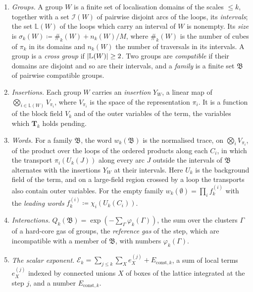 \documentclass[11pt]{preprint}
\DeclarePairedDelimiter{\abs}{\lvert}{\rvert}
\numberwithin{equation}{section}
\theoremstyle{definition}
\theoremstyle{remark}
\theoremstyle{plain}
\begin{document}
\begin{enumerate}[label=(\alph*)]
\item \emph{Groups.} A group $W$ is a finite set of localisation domains of the scales $\leq k$, together with a set $\mathcal I(W)$ of pairwise disjoint arcs of the loops, its \emph{intervals}; the set $\mathbb L(W)$ of the loops which carry an interval of $W$ is nonempty. Its \emph{size} is $\sigma_k(W) \coloneqq \#_k(W) + n_k(W)/M$, where $\#_k(W)$ is the number of cubes of $\pi_k$ in its domains and $n_k(W)$ the number of traversals in its intervals. A group is a \emph{cross group} if $\abs{\mathbb L(W)} \geq 2$. Two groups are \emph{compatible} if their domains are disjoint and so are their intervals, and a \emph{family} is a finite set $\mathfrak B$ of pairwise compatible groups.
\item \emph{Insertions.} Each group $W$ carries an \emph{insertion} $Y_W$, a linear map of $\bigotimes_{i \in \mathbb L(W)}V_{\pi_i}$, where $V_{\pi_i}$ is the space of the representation $\pi_i$. It is a function of the block field $V_k$ and of the outer variables of the term, the variables which $\mathbf T_k$ holds pending.
\item \emph{Words.} For a family $\mathfrak B$, the word $w_k(\mathfrak B)$ is the normalised trace, on $\bigotimes_iV_{\pi_i}$, of the product over the loops of the ordered products along each $C_i$, in which the transport $\pi_i(U_k(J))$ along every arc $J$ outside the intervals of $\mathfrak B$ alternates with the insertions $Y_W$ at their intervals. Here $U_k$ is the background field of the term, and on a large-field region crossed by a loop the transports also contain outer variables. For the empty family $w_k(\emptyset) = \prod_if^{(i)}_k$ with the \emph{leading words} $f^{(i)}_k \coloneqq \chi_i(U_k(C_i))$.
\item \emph{Interactions.} $Q_k(\mathfrak B) = \exp(-\sum_{\Gamma}\varphi_k(\Gamma))$, the sum over the clusters $\Gamma$ of a hard-core gas of groups, the \emph{reference gas} of the step, which are incompatible with a member of $\mathfrak B$, with numbers $\varphi_k(\Gamma)$.
\item \emph{The scalar exponent.} $\mathcal E_k = \sum_{j \leq k}\sum_Xe^{(j)}_X + E_{\mathrm{const},k}$, a sum of local terms $e^{(j)}_X$ indexed by connected unions $X$ of boxes of the lattice integrated at the step $j$, and a number $E_{\mathrm{const},k}$.
\end{enumerate}
\end{document}
